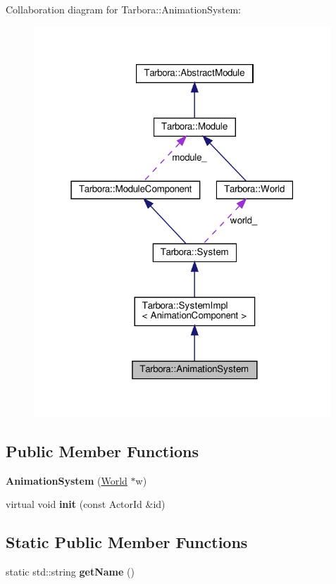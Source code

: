 Collaboration diagram for Tarbora\+:\+:Animation\+System\+:
\nopagebreak
\begin{figure}[H]
\begin{center}
\leavevmode
\includegraphics[width=316pt]{classTarbora_1_1AnimationSystem__coll__graph}
\end{center}
\end{figure}
\subsection*{Public Member Functions}
\begin{DoxyCompactItemize}
\item 
\mbox{\label{classTarbora_1_1AnimationSystem_a15c1e060a4dffe2fae17adb2b1984500}} 
{\bfseries Animation\+System} (\hyperlink{classTarbora_1_1World}{World} $\ast$w)
\item 
\mbox{\label{classTarbora_1_1AnimationSystem_a883d0cc7a780db4b7713b6c64fb50e13}} 
virtual void {\bfseries init} (const Actor\+Id \&id)
\end{DoxyCompactItemize}
\subsection*{Static Public Member Functions}
\begin{DoxyCompactItemize}
\item 
\mbox{\label{classTarbora_1_1AnimationSystem_af789b917c68f8b9d5b74ede0eeaae381}} 
static std\+::string {\bfseries get\+Name} ()
\end{DoxyCompactItemize}
